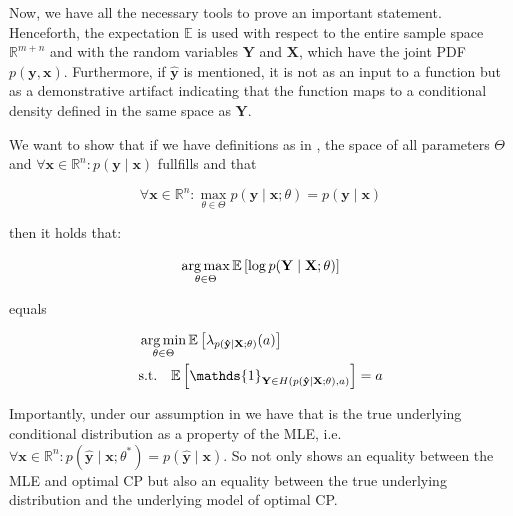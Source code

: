 Now, we have all the necessary tools to prove an important statement. Henceforth, the expectation $\mathbb{E}$ is used with respect to the entire sample space $\mathbb{R}^{m+n}$ and with the random variables $\mathbf{Y}$ and $\mathbf{X}$, which have the joint PDF $p(\mathbf{y}, \mathbf{x})$. Furthermore, if $\mathbf{\hat{y}}$ is mentioned, it is not as an input to a function but as a demonstrative artifact indicating that the function maps to a conditional density defined in the same space as $\mathbf{Y}$.

\begin{theorem}\label{thm:optimal_cp}
    We want to show that if we have definitions as in , the space of all parameters $\Theta$ and $\forall \mathbf{x}\in\mathbb{R}^n: p(\mathbf{y}\mid \mathbf{x})$ fullfills  and that

    \begin{equation}
        \forall \mathbf{x}\in \mathbb{R}^n: \max_{\theta \in \Theta} p(\mathbf{y} \mid \mathbf{x}; \theta) = p(\mathbf{y} \mid \mathbf{x})
        \label{eq:assn_mle_is_true}
    \end{equation}

    then it holds that:

    \begin{equation}
        \operatorname*{arg\,max}_{\theta \in \Theta}  \mathbb{E} \left[ \log
            p(\mathbf{Y} \mid \mathbf{X}; \theta) \right]
        \label{eq:maximum_log_likelihood}
    \end{equation}

    equals

    \begin{align}
         & \argmin_{\theta \in \Theta} \mathbb{E} \left[
            \lambda_{p(\mathbf{\hat{y}}\mid\mathbf{X}; \theta)}( a)
        \right]                                          \\
         & \text{s.t.} \quad \mathbb{E} \left[
        \mathds{1}_{\mathbf{Y} \in
        H(p(\mathbf{\hat{y}} \mid \mathbf{X}; \theta), a)} \right]
        = a
    \end{align}

\end{theorem}

Importantly, under our assumption in  we have that  is the true underlying conditional distribution as a property of the MLE, i.e.\ $\forall \mathbf{x}\in\mathbb{R}^n: p(\mathbf{\hat{y}}\mid\mathbf{x}; \theta^*) = p(\mathbf{\hat{y}}\mid\mathbf{x})$. So  not only shows an equality between the MLE and optimal CP but also an equality between the true underlying distribution and the underlying model of optimal CP.\@


